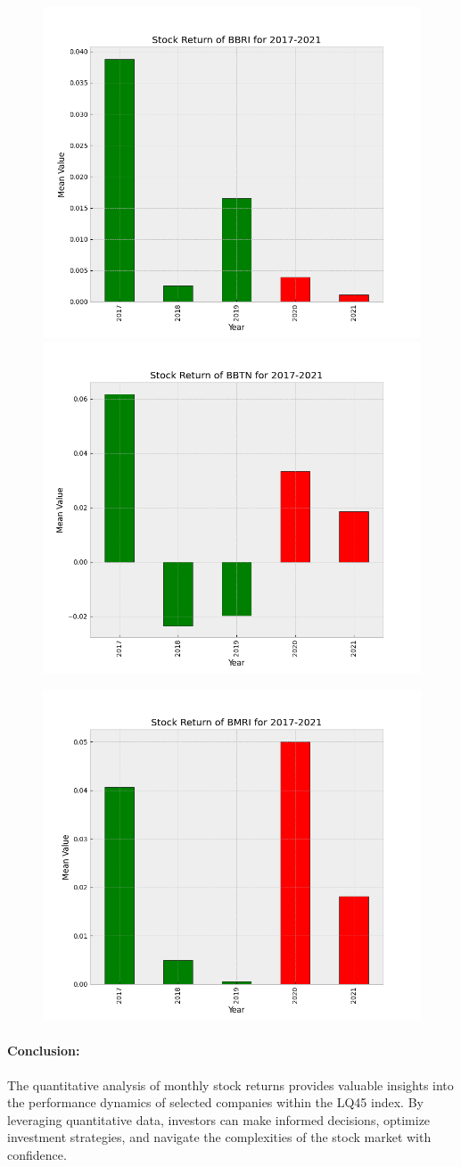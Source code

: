 \begin{figure}[H]
    \includegraphics[width = .55\textwidth ]{figures/BBRI.png}
    \includegraphics[width = .55\textwidth ]{figures/BBTN.png}
\end{figure}

\begin{figure}[H]
    \centering
    \includegraphics[width = .55\textwidth ]{figures/BMRI.png}
\end{figure}

\paragraph{Conclusion:}
\par The quantitative analysis of monthly stock returns provides valuable insights into the performance dynamics of selected companies within the LQ45 index. By leveraging quantitative data, investors can make informed decisions, optimize investment strategies, and navigate the complexities of the stock market with confidence.







